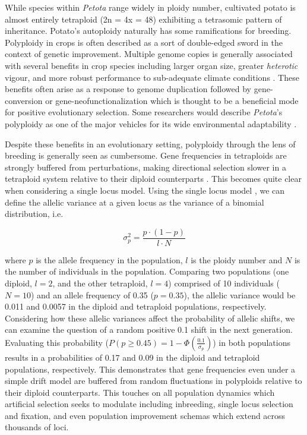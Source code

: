 \documentclass[
]{article}
\begin{document}
While species within \emph{Petota} range widely in ploidy number,
cultivated potato is almost entirely tetraploid (2n = 4x = 48)
exhibiting a tetrasomic pattern of inheritance. Potato's autoploidy
naturally has some ramifications for breeding. Polyploidy in crops is
often described as a sort of double-edged sword in the context of
genetic improvement. Multiple genome copies is generally associated with
several benefits in crop species including larger organ size, greater
\emph{heterotic} vigour, and more robust performance to sub-adequate
climate conditions \autocite{Osborn2003,Renny-Byfield2014}. These
benefits often arise as a response to genome duplication followed by
gene-conversion or gene-neofunctionalization which is thought to be a
beneficial mode for positive evolutionary selection. Some researchers
would describe \emph{Petota}'s polyploidy as one of the major vehicles
for its wide environmental adaptability \autocite{Hijmans2007,Tai2025}.

Despite these benefits in an evolutionary setting, polyploidy through
the lens of breeding is generally seen as cumbersome. Gene frequencies
in tetraploids are strongly buffered from perturbations, making
directional selection slower in a tetraploid system relative to their
diploid counterparts \autocite{Osborn2003}. This becomes quite clear
when considering a single locus model. Using the single locus model
\autocite{Bernardo2002a}, we can define the allelic variance at a given
locus as the variance of a binomial distribution, i.e.

\[ \sigma^2_p = \frac{p\cdot (1-p)}{l \cdot N} \]

where \(p\) is the allele frequency in the population, \(l\) is the
ploidy number and \(N\) is the number of individuals in the population.
Comparing two populations (one diploid, \(l = 2\), and the other
tetraploid, \(l = 4\)) comprised of 10 individuals (\(N = 10\)) and an
allele frequency of 0.35 (\(p = 0.35\)), the allelic variance would be
0.011 and 0.0057 in the diploid and tetraploid populations,
respectively. Considering how these allelic variances affect the
probability of allelic shifts, we can examine the question of a random
positive 0.1 shift in the next generation. Evaluating this probability
(\(P(p \geq 0.45) = 1 - \Phi\left(\frac{0.1}{\sigma_p}\right)\)) in both
populations results in a probabilities of 0.17 and 0.09 in the diploid
and tetraploid populations, respectively. This demonstrates that gene
frequencies even under a simple drift model are buffered from random
fluctuations in polyploids relative to their diploid counterparts. This
touches on all population dynamics which artificial selection seeks to
modulate including inbreeding, single locus selection and fixation, and
even population improvement schemas which extend across thousands of
loci.
\end{document}
